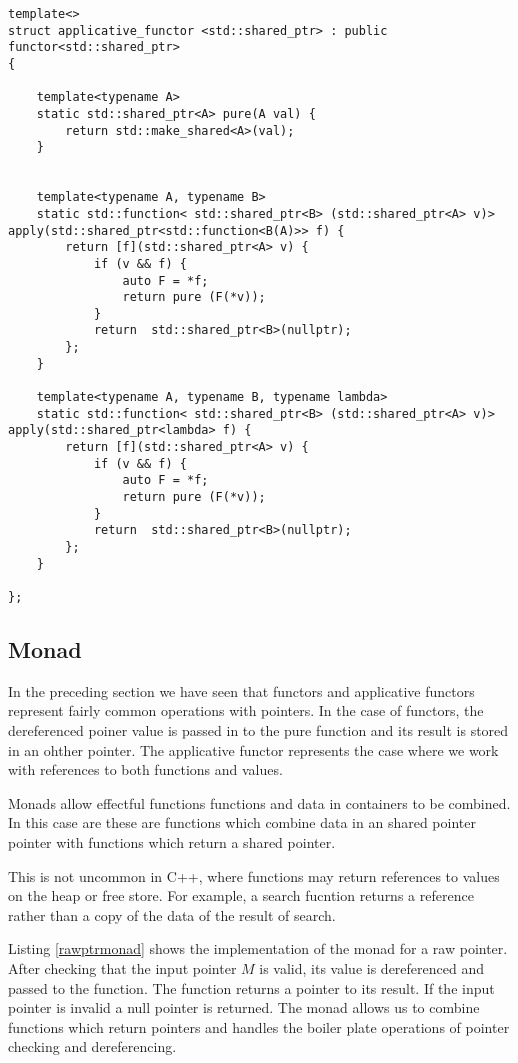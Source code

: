 \documentclass[12pt,fleqn]{article}
\begin{document}
% 
\begin{minipage}{\linewidth}
\begin{lstlisting}[caption=applicative functor implemention for std::shared\_ptr, label=ptrapp]
template<>
struct applicative_functor <std::shared_ptr> : public functor<std::shared_ptr>
{

	template<typename A>
	static std::shared_ptr<A> pure(A val) {
		return std::make_shared<A>(val);
	}

	
	template<typename A, typename B>
	static std::function< std::shared_ptr<B> (std::shared_ptr<A> v)> apply(std::shared_ptr<std::function<B(A)>> f) {
		return [f](std::shared_ptr<A> v) {
			if (v && f) {
				auto F = *f;
				return pure (F(*v)); 
			}
			return  std::shared_ptr<B>(nullptr);
		};
    }

	template<typename A, typename B, typename lambda>
	static std::function< std::shared_ptr<B> (std::shared_ptr<A> v)> apply(std::shared_ptr<lambda> f) {
		return [f](std::shared_ptr<A> v) {
			if (v && f) {
				auto F = *f;
				return pure (F(*v)); 
			}
			return  std::shared_ptr<B>(nullptr);
		};
    }
    
};
\end{lstlisting}
\end{minipage}

   
%
\subsection{Monad}
%
%
%

In the preceding section we have seen that functors and applicative functors represent fairly common operations with pointers.
In the case of functors, the dereferenced poiner value is passed in to the pure function and its result is stored in an ohther pointer.
The applicative functor represents the case where we work with references to both functions and values.

Monads allow effectful functions functions and data in containers to be combined. 
In this case are these are functions which combine data in an shared pointer pointer with functions which return a shared pointer.

This is not uncommon in C++, where functions may return references to values on the heap or free store.
For example, a search fucntion returns a reference rather than a copy of the data of the result of search.

Listing \ref{rawptrmonad} shows the implementation of the monad for a raw pointer.
After checking that the input pointer $M$ is valid, its value is dereferenced and passed to the function.
The function returns a pointer to its result. 
If the input pointer is invalid a null pointer is returned.
The monad allows us to combine functions which return pointers and handles the boiler plate operations of pointer checking and dereferencing.
\end{document}
